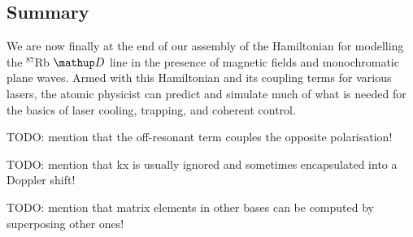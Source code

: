 \subsection{Summary}
We are now finally at the end of our assembly of the Hamiltonian for modelling the $^{87}$Rb $\up{D}$ line in the presence of magnetic fields and monochromatic plane waves. Armed with this Hamiltonian and its coupling terms for various lasers, the atomic physicist can predict and simulate much of what is needed for the basics of laser cooling, trapping, and coherent control.


TODO: mention that the off-resonant term couples the opposite polarisation!

TODO: mention that kx is usually ignored and sometimes encapsulated into a Doppler shift!

TODO: mention that matrix elements in other bases can be computed by superposing other ones!
